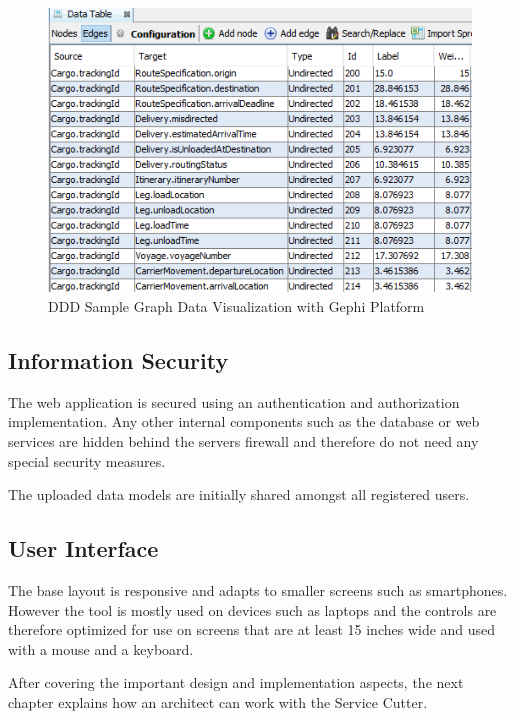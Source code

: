 \begin{figure}[H]
	\includegraphics[scale=0.8]{images/ddd_semantic_proximity_debug_data.png}
	\caption{DDD Sample Graph Data Visualization with Gephi Platform}
	\label{fig:dddSampleData}
\end{figure}


\subsection{Information Security}

The web application is secured using an authentication and authorization implementation. Any other internal components such as the database or web services are hidden behind the servers firewall and therefore do not need any special security measures.

The uploaded data models are initially shared amongst all registered users.

\subsection{User Interface}

The base layout is responsive and adapts to smaller screens such as smartphones. However the tool is mostly used on devices such as laptops and the controls are therefore optimized for use on screens that are at least 15 inches wide and used with a mouse and a keyboard.


\bigskip
After covering the important design and implementation aspects, the next chapter explains how an architect can work with the Service Cutter.
